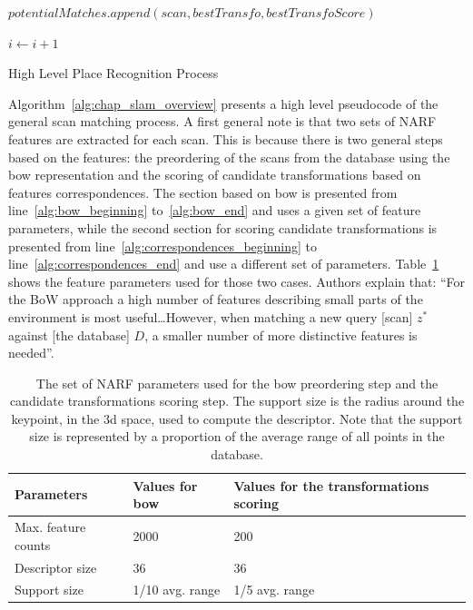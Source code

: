 \begin{algorithm}
\begin{algorithmic}[1]
        \State
        \State $potentialMatches.append(scan, bestTransfo, bestTransfoScore)$
        \EndIf

        \State
        \State $i \gets i+1$
        \EndWhile \label{alg:correspondences_end}

        \State
        \State {}
        \EndFunction
    \end{algorithmic}

    \caption{High Level Place Recognition Process~\citep{Steder2011b}}
    \label{alg:chap_slam_overview}
\end{algorithm}

Algorithm~\ref{alg:chap_slam_overview} presents a high level pseudocode of the general scan matching process. A first general note is that two sets of NARF features are extracted for each scan. This is because there is two general steps based on the features: the preordering of the scans from the database using the \gls*{bow} representation and the scoring of candidate transformations based on features correspondences. The section based on \gls*{bow} is presented from line~\ref{alg:bow_beginning} to~\ref{alg:bow_end} and uses a given set of feature parameters, while the second section for scoring candidate transformations is presented from line~\ref{alg:correspondences_beginning} to line~\ref{alg:correspondences_end} and use a different set of parameters. Table~\ref{tab:chap_slam_narf_parameters} shows the feature parameters used for those two cases. Authors explain that: \enquote{For the BoW approach a high number of features describing small parts of the environment is most useful\dots However, when matching a new query [scan] $z^*$ against [the database] $D$, a smaller number of more distinctive features is needed}.

\begin{table}[H]
    \centering
    \begin{tabular}{@{}lll@{}}
        \toprule
        \textbf{Parameters}  & \textbf{Values for \gls*{bow}} & \textbf{Values for the transformations scoring} \\
        \hline
        Max. feature counts & 2000                          & 200                                \\
        Descriptor size     & 36                            & 36                                 \\
        Support size        & 1/10 avg. range               & 1/5 avg. range                     \\
        \bottomrule
    \end{tabular}
    \caption[The set of NARF parameters used for the \gls*{bow} preordering step and the candidate transformations scoring step.]{The set of NARF parameters used for the \gls*{bow} preordering step and the candidate transformations scoring step. The support size is the radius around the keypoint, in the \gls*{3d} space, used to compute the descriptor. Note that the support size is represented by a proportion of the average range of all points in the database.}
    \label{tab:chap_slam_narf_parameters}
\end{table}

